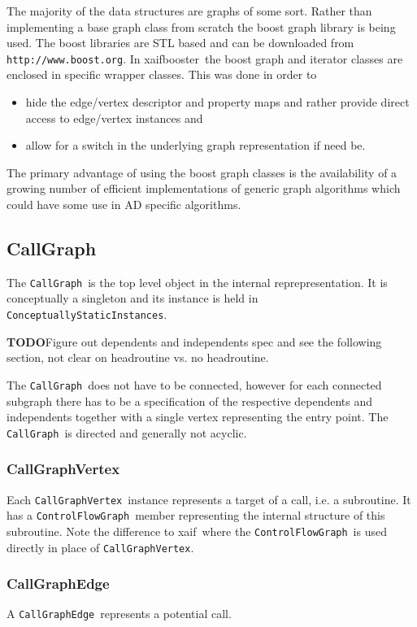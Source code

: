 \documentclass{book}
\newcommand{\InternalRep}{internal reprepresentation}
\newcommand{\todo}{{\bf TODO}}
\newcommand{\xaif}{xaif}
\newcommand{\xaifbooster}{xaifbooster}
\newcommand{\CallGraph}{{\tt CallGraph}}
\newcommand{\CallGraphVertex}{{\tt CallGraphVertex}}
\newcommand{\CallGraphEdge}{{\tt CallGraphEdge}}
\newcommand{\ConceptuallyStaticInstances}{{\tt ConceptuallyStaticInstances}}
\newcommand{\ControlFlowGraph}{{\tt ControlFlowGraph}}
\begin{document}
The majority of the data structures are graphs of some sort. Rather than implementing a base graph class 
from scratch the boost graph library is being used. The boost libraries are STL based and 
can be downloaded from {\tt http://www.boost.org}. 
In \xaifbooster\ the boost graph and iterator classes are 
enclosed in specific wrapper classes. This was done in order to 
\begin{itemize}
\item hide the edge/vertex descriptor and property maps and rather provide direct access to edge/vertex instances and
\item allow for a switch in the underlying graph representation if need be.
\end{itemize}
The primary advantage of using the boost graph classes is the availability of a growing number of 
efficient implementations of generic graph algorithms which could have some use in AD specific algorithms.

\subsection{CallGraph} 
\label{ssec:CallGraph}
The \CallGraph\ is the top level object in the \InternalRep. It is conceptually a 
singleton \cite{DesignPatterns}  and its instance is held in \ConceptuallyStaticInstances. 

\todo Figure out dependents and independents spec and see the following section, not clear on 
headroutine vs. no headroutine.

The \CallGraph\ does not have to be connected, however for each connected subgraph there has 
to be a specification of the respective dependents and independents together with a single 
vertex representing the entry point.
The \CallGraph\ is directed and generally not acyclic.

\subsubsection{CallGraphVertex} 
Each \CallGraphVertex\ instance represents a target of a call, i.e. a subroutine. It has a 
\ControlFlowGraph\ member representing the internal structure of this subroutine. 
Note the difference to \xaif\ where the \ControlFlowGraph\ is used directly in place of 
\CallGraphVertex.

\subsubsection{CallGraphEdge} 
A  \CallGraphEdge\ represents a potential call. 
\end{document}
